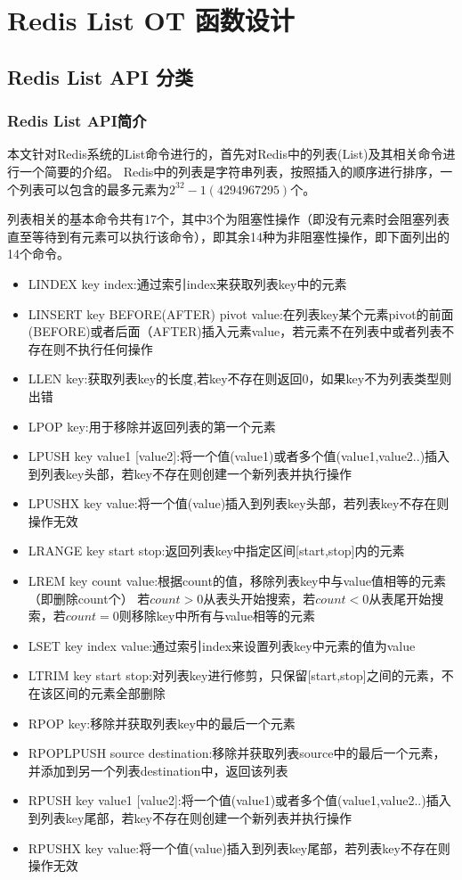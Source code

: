 \chapter{Redis List OT 函数设计}
\section{Redis List API 分类}
\subsection{Redis List API简介}
\par 本文针对Redis系统的List命令进行的，首先对Redis中的列表(List)及其相关命令进行一个简要的介绍。
Redis中的列表是字符串列表，按照插入的顺序进行排序，一个列表可以包含的最多元素为$2^{32}-1(4294967295)$个。

\par 列表相关的基本命令共有17个，其中3个为阻塞性操作（即没有元素时会阻塞列表直至等待到有元素可以执行该命令），即其余14种为非阻塞性操作，即下面列出的14个命令。\\

\begin{itemize}
\item LINDEX  key index:通过索引index来获取列表key中的元素
\item LINSERT key BEFORE(AFTER) pivot value:在列表key某个元素pivot的前面(BEFORE)或者后面（AFTER)插入元素value，若元素不在列表中或者列表不存在则不执行任何操作
\item LLEN key:获取列表key的长度,若key不存在则返回0，如果key不为列表类型则出错
\item LPOP key:用于移除并返回列表的第一个元素
\item LPUSH key value1 [value2]:将一个值(value1)或者多个值(value1,value2..)插入到列表key头部，若key不存在则创建一个新列表并执行操作
\item LPUSHX key value:将一个值(value)插入到列表key头部，若列表key不存在则操作无效
\item LRANGE key start stop:返回列表key中指定区间[start,stop]内的元素
\item LREM key count value:根据count的值，移除列表key中与value值相等的元素（即删除count个）
若$count > 0$从表头开始搜索，若$count < 0$从表尾开始搜索，若$count = 0$则移除key中所有与value相等的元素
\item LSET key index value:通过索引index来设置列表key中元素的值为value
\item LTRIM key start stop:对列表key进行修剪，只保留[start,stop]之间的元素，不在该区间的元素全部删除
\item RPOP key:移除并获取列表key中的最后一个元素
\item RPOPLPUSH source destination:移除并获取列表source中的最后一个元素，并添加到另一个列表destination中，返回该列表
\item RPUSH key value1 [value2]:将一个值(value1)或者多个值(value1,value2..)插入到列表key尾部，若key不存在则创建一个新列表并执行操作
\item RPUSHX key value:将一个值(value)插入到列表key尾部，若列表key不存在则操作无效
\end{itemize}

